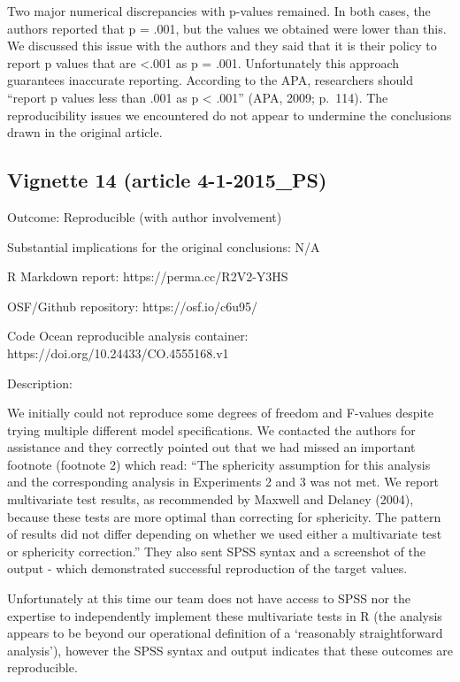 \begin{appendix}
Two major numerical discrepancies with p-values remained. In both cases,
the authors reported that p = .001, but the values we obtained were
lower than this. We discussed this issue with the authors and they said
that it is their policy to report p values that are \textless{}.001 as p
= .001. Unfortunately this approach guarantees inaccurate reporting.
According to the APA, researchers should ``report p values less than
.001 as p \textless{} .001'' (APA, 2009; p.~114). The reproducibility
issues we encountered do not appear to undermine the conclusions drawn
in the original article.

\hypertarget{vignette-14-article-4-1-2015_ps}{%
\subsection{Vignette 14 (article
4-1-2015\_PS)}\label{vignette-14-article-4-1-2015_ps}}

Outcome: Reproducible (with author involvement)

Substantial implications for the original conclusions: N/A

R Markdown report: https://perma.cc/R2V2-Y3HS

OSF/Github repository: https://osf.io/c6u95/

Code Ocean reproducible analysis container:
https://doi.org/10.24433/CO.4555168.v1

Description:

We initially could not reproduce some degrees of freedom and F-values
despite trying multiple different model specifications. We contacted the
authors for assistance and they correctly pointed out that we had missed
an important footnote (footnote 2) which read: ``The sphericity
assumption for this analysis and the corresponding analysis in
Experiments 2 and 3 was not met. We report multivariate test results, as
recommended by Maxwell and Delaney (2004), because these tests are more
optimal than correcting for sphericity. The pattern of results did not
differ depending on whether we used either a multivariate test or
sphericity correction.'' They also sent SPSS syntax and a screenshot of
the output - which demonstrated successful reproduction of the target
values.

Unfortunately at this time our team does not have access to SPSS nor the
expertise to independently implement these multivariate tests in R (the
analysis appears to be beyond our operational definition of a
`reasonably straightforward analysis'), however the SPSS syntax and
output indicates that these outcomes are reproducible.


\end{appendix}
